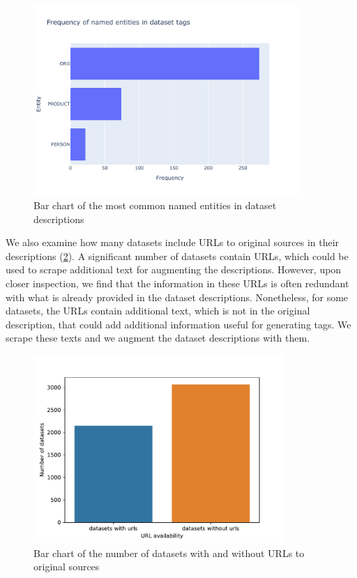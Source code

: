\begin{figure}[h]
    \centering
    \includegraphics[width=0.9\textwidth]{figures/ner.pdf}
    \caption{Bar chart of the most common named entities in dataset descriptions}
    \label{fig:ner}
\end{figure}

We also examine how many datasets include URLs to original sources in their descriptions (\cref{fig:url_availability}). A significant number of datasets contain URLs, which could be used to scrape additional text for augmenting the descriptions. However, upon closer inspection, we find that the information in these URLs is often redundant with what is already provided in the dataset descriptions. Nonetheless, for some datasets, the URLs contain additional text, which is not in the original description, that could add additional information useful for generating tags. We scrape these texts and we augment the dataset descriptions with them.

\begin{figure}[h]
    \centering
    \includegraphics[width=0.85\textwidth]{figures/url_availability.pdf}
    \caption{Bar chart of the number of datasets with and without URLs to original sources}
    \label{fig:url_availability}
\end{figure}

